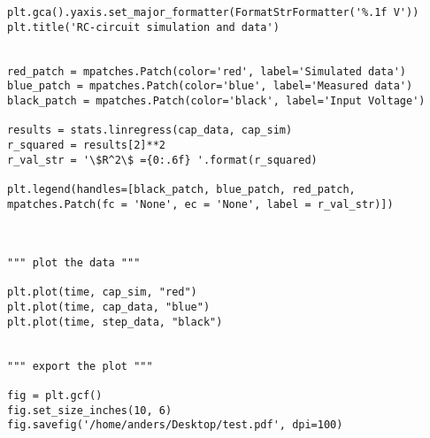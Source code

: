 \begin{verbatim}
plt.gca().yaxis.set_major_formatter(FormatStrFormatter('%.1f V'))
plt.title('RC-circuit simulation and data')                         


red_patch = mpatches.Patch(color='red', label='Simulated data')     
blue_patch = mpatches.Patch(color='blue', label='Measured data')
black_patch = mpatches.Patch(color='black', label='Input Voltage')

results = stats.linregress(cap_data, cap_sim)    
r_squared = results[2]**2                   
r_val_str = '\$R^2\$ ={0:.6f} '.format(r_squared)                     

plt.legend(handles=[black_patch, blue_patch, red_patch, mpatches.Patch(fc = 'None', ec = 'None', label = r_val_str)])



""" plot the data """

plt.plot(time, cap_sim, "red")
plt.plot(time, cap_data, "blue")
plt.plot(time, step_data, "black")


""" export the plot """

fig = plt.gcf()
fig.set_size_inches(10, 6)
fig.savefig('/home/anders/Desktop/test.pdf', dpi=100)
\end{verbatim}